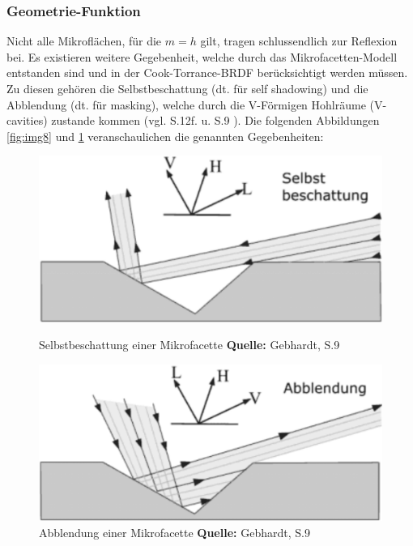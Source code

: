 \documentclass[
  11pt,
  a4paper,
  oneside
  ]{article}
\begin{document}
\subsubsection{Geometrie-Funktion}
Nicht alle Mikroflächen, für die $m = h$ gilt, tragen schlussendlich zur Reflexion bei. Es existieren weitere Gegebenheit, welche durch das Mikrofacetten-Modell entstanden sind und in der Cook-Torrance-BRDF berücksichtigt werden müssen. Zu diesen gehören die Selbstbeschattung (dt. für self shadowing) und die Abblendung (dt. für masking), welche durch die V-Förmigen Hohlräume (V-cavities) zustande kommen 
(vgl. S.12f. \cite{rtrPaper} u. S.9 \cite{irrlichtOrg}). Die folgenden Abbildungen \ref{fig:img8} und \ref{fig:img9} veranschaulichen die genannten Gegebenheiten: 
\begin{figure}[H]
  \centering
  \begin{minipage}{.48\textwidth}
    \centering
    \includegraphics*[width=1\linewidth]{images/selstbeschattung.png}
    \caption{Selbstbeschattung einer Mikrofacette \footnotesize\textbf{Quelle:} Gebhardt, S.9  \cite{irrlichtOrg}}
    \label{fig:img8}
  \end{minipage}%
  \hfill
  \begin{minipage}{.48\textwidth}
    \centering
    \includegraphics*[width=1\linewidth]{images/abblendung.png}
    \caption{Abblendung einer Mikrofacette \footnotesize\textbf{Quelle:} Gebhardt, S.9 \cite{irrlichtOrg}}
    \label{fig:img9}
  \end{minipage}
\end{figure}
\end{document}
